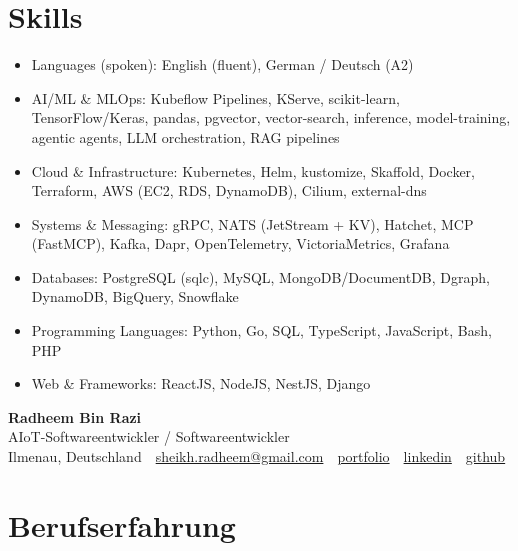 \documentclass[10pt,a4paper]{resume}
\makeatletter
\newcommand{\Portfolio}{https://radheem.github.io/my-cv}
\newcommand{\PortfolioText}{portfolio}
\newcommand{\GitHub}{https://github.com/radheem}
\newcommand{\LinkedIn}{https://www.linkedin.com/in/radheem-razi}
\newcommand{\Email}{sheikh.radheem@gmail.com}
\makeatother
\begin{document}
\section{Skills}

\begin{itemize}[leftmargin=1.4em,nosep,topsep=2pt]
  \item Languages (spoken): English (fluent), German / Deutsch (A2)
  \item AI/ML \& MLOps: Kubeflow Pipelines, KServe, scikit-learn, TensorFlow/Keras, pandas, pgvector, vector-search, inference, model-training, agentic agents, LLM orchestration, RAG pipelines
  \item Cloud \& Infrastructure: Kubernetes, Helm, kustomize, Skaffold, Docker, Terraform, AWS (EC2, RDS, DynamoDB), Cilium, external-dns
  \item Systems \& Messaging: gRPC, NATS (JetStream + KV), Hatchet, MCP (FastMCP), Kafka, Dapr, OpenTelemetry, VictoriaMetrics, Grafana
  \item Databases: PostgreSQL (sqlc), MySQL, MongoDB/DocumentDB, Dgraph, DynamoDB, BigQuery, Snowflake
  \item Programming Languages: Python, Go, SQL, TypeScript, JavaScript, Bash, PHP
  \item Web \& Frameworks: ReactJS, NodeJS, NestJS, Django
\end{itemize}

\clearpage
{}

\begin{center}
  {\huge\bfseries Radheem Bin Razi}\\[3pt]
  {\large AIoT-Softwareentwickler / Softwareentwickler}\\[6pt]
  \small
  Ilmenau, Deutschland \,\textbar\,
  \href{mailto:\Email}{\Email} \,\textbar\,
  \href{\Portfolio}{\PortfolioText} \,\textbar\,
  \href{\LinkedIn}{linkedin} \,\textbar\,
  \href{\GitHub}{github}
\end{center}
\vspace{2pt}

\section{Berufserfahrung}
\end{document}
